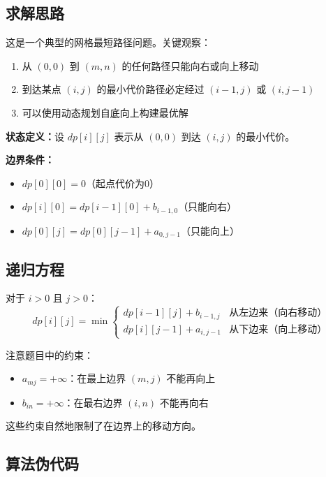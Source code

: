 \documentclass[UTF8,12pt,a4paper]{ctexart}
\begin{document}
\subsection*{求解思路}

这是一个典型的网格最短路径问题。关键观察：
\begin{enumerate}
	\item 从 $(0,0)$ 到 $(m,n)$ 的任何路径只能向右或向上移动
	\item 到达某点 $(i,j)$ 的最小代价路径必定经过 $(i-1,j)$ 或 $(i,j-1)$
	\item 可以使用动态规划自底向上构建最优解
\end{enumerate}

\textbf{状态定义：}设 $dp[i][j]$ 表示从 $(0,0)$ 到达 $(i,j)$ 的最小代价。

\textbf{边界条件：}
\begin{itemize}
	\item $dp[0][0] = 0$（起点代价为0）
	\item $dp[i][0] = dp[i-1][0] + b_{i-1,0}$（只能向右）
	\item $dp[0][j] = dp[0][j-1] + a_{0,j-1}$（只能向上）
\end{itemize}

\subsection*{递归方程}

对于 $i > 0$ 且 $j > 0$：
$$dp[i][j] = \min\begin{cases}
dp[i-1][j] + b_{i-1,j} & \text{从左边来（向右移动）} \\
dp[i][j-1] + a_{i,j-1} & \text{从下边来（向上移动）}
\end{cases}$$

注意题目中的约束：
\begin{itemize}
	\item $a_{mj} = +\infty$：在最上边界 $(m, j)$ 不能再向上
	\item $b_{in} = +\infty$：在最右边界 $(i, n)$ 不能再向右
\end{itemize}

这些约束自然地限制了在边界上的移动方向。

\subsection*{算法伪代码}
\end{document}
